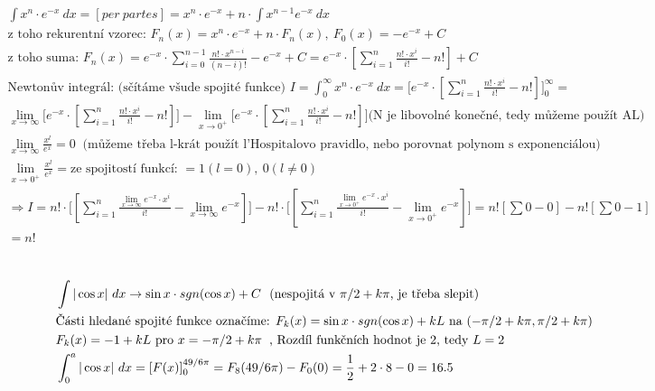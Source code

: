 \documentclass[a4paper]{article}
\begin{document}
\section{}
\begin{align*}
	& \int x^n \cdot e^{-x}\ dx = [per\ partes] = x^n \cdot e^{-x} + n \cdot \int x^{n-1}e^{-x}\ dx \\
	& \text{z toho rekurentní vzorec: } F_n(x) = x^n \cdot e^{-x} + n \cdot F_n(x),\ F_0(x) = -e^{-x} + C \\
	& \text{z toho suma: } F_n(x) = e^{-x} \cdot \sum_{i=0}^{n-1} \frac{n!\cdot x^{n-i}}{(n-i)!} -e^{-x} + C = e^{-x} \cdot [\sum_{i=1}^{n} \frac{n!\cdot x^i}{i!} -n!] + C \\
	& \text{Newtonův integrál: (sčítáme všude spojité funkce)\ } I = \int _0^{\infty} x^n \cdot e^{-x}\ dx = \bigg[e^{-x} \cdot [\sum_{i=1}^{n} \frac{n!\cdot x^i}{i!} -n!]\bigg]_0^{\infty} = \\
	& \lim_{x\rightarrow \infty}\bigg[e^{-x} \cdot  [\sum_{i=1}^{n} \frac{n!\cdot x^i}{i!} -n!]\bigg] - \lim_{x\rightarrow 0^+} \bigg[e^{-x} \cdot [\sum_{i=1}^{n} \frac{n!\cdot x^i}{i!} -n!]\bigg] \text{(N je libovolné konečné, tedy můžeme použít AL)} \\
	& \lim_{x\rightarrow \infty} \frac{x^l}{e^x} = 0\ \text{ (můžeme třeba l-krát použít l'Hospitalovo pravidlo, nebo porovnat polynom s exponenciálou)} \\
	& \lim_{x\rightarrow 0^+} \frac{x^l}{e^x} = \text{ze spojitostí funkcí: } = 1 (l=0),\ 0 (l\ne 0) \\
	& \Rightarrow I = n!\cdot \bigg[[\sum_{i=1}^{n} \frac{\lim_{x\rightarrow \infty} e^{-x} \cdot x^i}{i!} -\lim_{x\rightarrow \infty} e^{-x} ]\bigg] -  n!\cdot \bigg[[\sum_{i=1}^{n} \frac{\lim_{x\rightarrow 0^+} e^{-x} \cdot x^i}{i!} -\lim_{x\rightarrow 0^+} e^{-x} ]\bigg] = n! [ \sum 0 - 0] - n! [ \sum 0 - 1] \\
	& = n!
\end{align*}
\section{}
\begin{align*}
	& \int |\cos x|\ dx \rightarrow \sin x \cdot sgn(\cos x) + C\ \text{ (nespojitá v $\pi/2+k\pi$, je třeba slepit)} \\
	& \text{Části hledané spojité funkce označíme: } F_k(x) = \sin x \cdot sgn(\cos x) +kL \text{ na } (-\pi/2 + k\pi, \pi/2+k\pi) \\
	& F_k(x) = -1 +kL \text{ pro } x = -\pi/2 + k\pi \hspace{0.2cm} \text{, Rozdíl funkčních hodnot je $2$, tedy $L=2$} \\
	& \int_0^a |\cos x|\ dx = [F(x)]_0^{49/6\pi} = F_8(49/6\pi)-F_0(0) = \frac{1}{2}+ 2\cdot 8 - 0 = 16.5
\end{align*}
\end{document}
